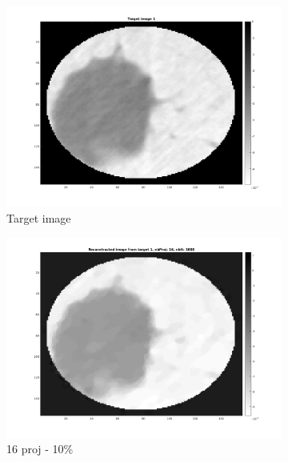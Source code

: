 \documentclass[10pt,a4paper,titlepage]{article}
\begin{document}
\begin{figure}[H]
        	
        	\begin{subfigure}[b]{0.32\textwidth}   
        	    \centering 
            	\includegraphics[width=\textwidth]{Sample1/target1.png}
            	\caption{Target image}
        	\end{subfigure}
        	\begin{subfigure}[b]{0.32\textwidth}   
        	    \centering 
        	    \includegraphics[width=\textwidth]{Sample1/L-D_5000/16_1_10.png}
        	    \caption{16 proj - 10\%}    
        	    \label{subfig:16p1L-D}
       		\end{subfigure}
        	\begin{subfigure}[b]{0.32\textwidth}  

\end{subfigure}
\end{figure}
\end{document}
